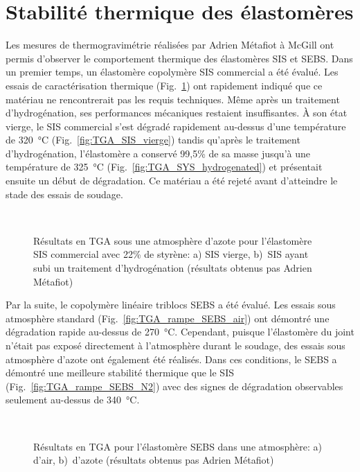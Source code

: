 \section{Stabilité thermique des élastomères}

Les mesures de thermogravimétrie réalisées par Adrien Métafiot à McGill ont permis d'observer le comportement thermique des élastomères SIS et SEBS. 
Dans un premier temps, un élastomère copolymère SIS commercial a été évalué. 
Les essais de caractérisation thermique (Fig.~\ref{fig:TGA_SIS}) ont rapidement indiqué que ce matériau ne rencontrerait pas les requis techniques. 
Même après un traitement d'hydrogénation, ses performances mécaniques restaient insuffisantes. 
À son état vierge, le SIS commercial s'est dégradé rapidement au-dessus d'une température de \SI[locale=FR]{320}{\celsius} (Fig.~\ref{fig:TGA_SIS_vierge}) tandis qu'après le traitement d'hydrogénation, l'élastomère a conservé 99,5\% de sa masse jusqu'à une température de \SI[locale=FR]{325}{\celsius} (Fig.~\ref{fig:TGA_SYS_hydrogenated}) et présentait ensuite un début de dégradation.  
Ce matériau a été rejeté avant d'atteindre le stade des essais de soudage. 

\begin{figure}[h]
	\centering
	\\
	\caption{Résultats en TGA sous une atmosphère d'azote pour l'élastomère SIS commercial avec 22\% de styrène: a) SIS vierge, b)~SIS ayant subi un traitement d'hydrogénation (résultats obtenus pas Adrien Métafiot)}
	\label{fig:TGA_SIS}
\end{figure}

Par la suite, le copolymère linéaire triblocs SEBS a été évalué. 
Les essais sous atmosphère standard (Fig.~\ref{fig:TGA_rampe_SEBS_air}) ont démontré une dégradation rapide au-dessus de \SI[locale=FR]{270}{\celsius}. 
Cependant, puisque l'élastomère du joint n'était pas exposé directement à l'atmosphère durant le soudage, des essais sous atmosphère d'azote ont également été réalisés. 
Dans ces conditions, le SEBS a démontré une meilleure stabilité thermique que le SIS (Fig.~\ref{fig:TGA_rampe_SEBS_N2}) avec des signes de dégradation observables seulement au-dessus de \SI[locale=FR]{340}{\celsius}. 

\begin{figure}[h]
	\centering
	\\
	\caption{Résultats en TGA pour l'élastomère SEBS dans une atmosphère: a) d'air, b)~d'azote (résultats obtenus pas Adrien Métafiot)}
	\label{fig:TGA_rampe_SEBS}
\end{figure}


